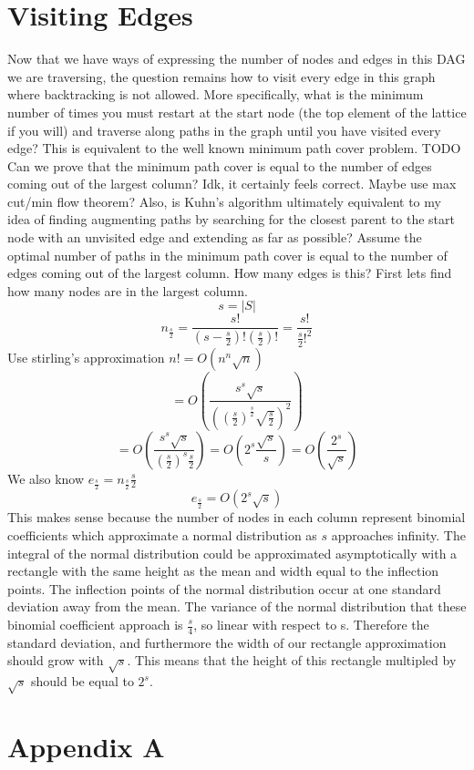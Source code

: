 \documentclass{article}
\begin{document}
\section{Visiting Edges}
Now that we have ways of expressing the number of nodes and edges in this DAG
we are traversing, the question remains how to visit every edge in this graph
where backtracking is not allowed. More specifically, what is the minimum
number of times you must restart at the start node (the top element of the
lattice if you will) and traverse along paths in the graph until you have
visited every edge? This is equivalent to the well known minimum path cover
problem.  TODO Can we prove that the minimum path cover is equal to the number
of edges coming out of the largest column? Idk, it certainly feels correct.
Maybe use max cut/min flow theorem? Also, is Kuhn's algorithm ultimately
equivalent to my idea of finding augmenting paths by searching for the closest
parent to the start node with an unvisited edge and extending as far as
possible?  Assume the optimal number of paths in the minimum path cover is
equal to the number of edges coming out of the largest column. How many edges
is this? First lets find how many nodes are in the largest column.
$$s = |S|$$
$$n_{\frac{s}{2}} = \frac{s!}{(s - \frac{s}{2})!(\frac{s}{2})!} = \frac{s!}{\frac{s}{2}!^2}$$
Use stirling's approximation $n! = O(n^n\sqrt{n})$
$$ = O(\frac{s^s\sqrt{s}}{((\frac{s}{2})^\frac{s}{2}\sqrt{\frac{s}{2}})^2})$$
$$ = O(\frac{s^s\sqrt{s}}{(\frac{s}{2})^s\frac{s}{2}}) = O(2^s\frac{\sqrt{s}}{s}) = O(\frac{2^s}{\sqrt{s}})$$
We also know $e_{\frac{s}{2}} = n_{\frac{s}{2}}\frac{s}{2}$
$$e_{\frac{s}{2}} = O(2^s\sqrt{s})$$
This makes sense because the number of nodes in each column represent binomial coefficients which approximate a normal distribution as $s$ approaches infinity. The integral of the normal distribution could be approximated asymptotically with a rectangle with the same height as the mean and width equal to the inflection points. The inflection points of the normal distribution occur at one standard deviation away from the mean. The variance of the normal distribution that these binomial coefficient approach is $\frac{s}{4}$, so linear with respect to s. Therefore the standard deviation, and furthermore the width of our rectangle approximation should grow with $\sqrt{s}$. This means that the height of this rectangle multipled by $\sqrt{s}$ should be equal to $2^s$.


\section{Appendix A}
\label{ap:A}
\end{document}
